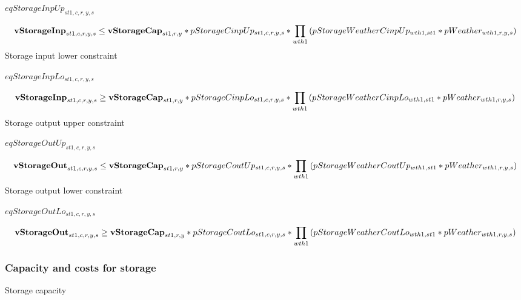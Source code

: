 \documentclass{article}
\begin{document}
$eqStorageInpUp_{st1,c,r,y,s}$





\begin{dmath}
{\bf vStorageInp}_{st1,c,r,y,s}  \le  {\bf vStorageCap}_{st1,r,y}*pStorageCinpUp_{st1,c,r,y,s}*\prod_{wth1}{\left(pStorageWeatherCinpUp_{wth1,st1}*pWeather_{wth1,r,y,s}\right)}
\end{dmath}
Storage input lower constraint







$eqStorageInpLo_{st1,c,r,y,s}$





\begin{dmath}
{\bf vStorageInp}_{st1,c,r,y,s}  \ge  {\bf vStorageCap}_{st1,r,y}*pStorageCinpLo_{st1,c,r,y,s}*\prod_{wth1}{\left(pStorageWeatherCinpLo_{wth1,st1}*pWeather_{wth1,r,y,s}\right)}
\end{dmath}
Storage output upper constraint







$eqStorageOutUp_{st1,c,r,y,s}$





\begin{dmath}
{\bf vStorageOut}_{st1,c,r,y,s}  \le  {\bf vStorageCap}_{st1,r,y}*pStorageCoutUp_{st1,c,r,y,s}*\prod_{wth1}{\left(pStorageWeatherCoutUp_{wth1,st1}*pWeather_{wth1,r,y,s}\right)}
\end{dmath}
Storage output lower constraint







$eqStorageOutLo_{st1,c,r,y,s}$





\begin{dmath}
{\bf vStorageOut}_{st1,c,r,y,s}  \ge  {\bf vStorageCap}_{st1,r,y}*pStorageCoutLo_{st1,c,r,y,s}*\prod_{wth1}{\left(pStorageWeatherCoutLo_{wth1,st1}*pWeather_{wth1,r,y,s}\right)}
\end{dmath}
\subsubsection*{Capacity and costs for storage}
Storage capacity
\end{document}
